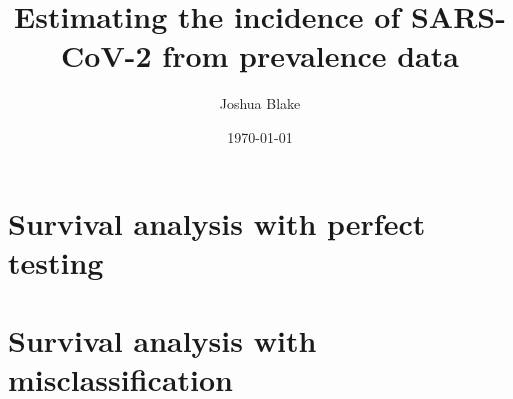 \documentclass[a4paper]{report}
\title{Estimating the incidence of SARS-CoV-2 from prevalence data}
\author{Joshua Blake}
\date{\today}
\begin{document}
\maketitle

\chapter{Survival analysis with perfect testing}



\chapter{Survival analysis with misclassification}


\end{document}
